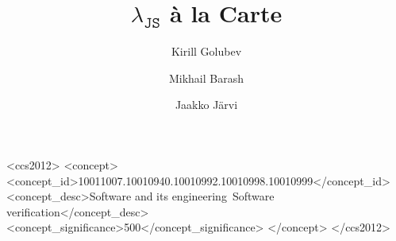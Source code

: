 \documentclass[sigplan,nonacm]{acmart}
\begin{document}
\title{$\lambda_{\texttt{JS}}$ à la Carte}

\author{Kirill Golubev}

\author{Mikhail Barash}

\author{Jaakko Järvi}






\renewcommand{\shortauthors}{Golubev}

\begin{CCSXML}
<ccs2012>
 <concept>
<concept_id>10011007.10010940.10010992.10010998.10010999</concept_id>
<concept_desc>Software and its engineering~Software verification</concept_desc>
<concept_significance>500</concept_significance>
</concept>
</ccs2012>
\end{CCSXML}

\end{document}
